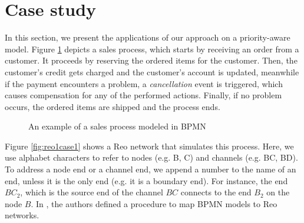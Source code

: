 \section{Case study}
\label{casestudy}
In this section, we present the applications of our approach on a priority-aware model. %
 Figure \ref{fig:bpmncase1} depicts a sales process, which starts by receiving an order from a customer. It proceeds by reserving the ordered items for the customer. Then, the customer's credit gets charged and the customer's account is updated, meanwhile if the payment encounters a problem, a \emph{cancellation} event is triggered, which causes compensation for any of the performed actions. Finally, if no problem occurs, the ordered items are shipped and the process ends. 

\begin{figure}[t]
  \begin{center}
  \end{center}
  \caption{An example of a sales process modeled in BPMN}
  \label{fig:bpmncase1}
\end{figure}

Figure \ref{fig:reo1case1} shows a Reo network that simulates this process. Here, we use alphabet characters to refer to nodes (e.g. B, C) and channels (e.g. BC, BD). To address a node end or a channel end, we 
append a number to the name of an end, unless it is the only end (e.g. it is a boundary end). %
For instance, the end $BC_{2}$, which is the source end of the channel $BC$ connects to the end $B_2$ on the node $B$. %
In \cite{behnaz}, the authors defined a procedure to map BPMN models to Reo networks. %

